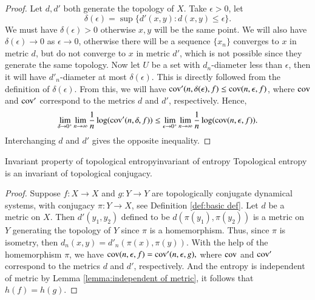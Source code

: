\documentclass[12pt,a4paper]{article}
\begin{document}
	\begin{proof}
		Let $d,d'$ both generate the topology of $X$. Take $\epsilon>0$, let
		$$
		\delta(\epsilon)=\sup \{d'(x,y):d(x,y)\leq \epsilon\}.
		$$
		We must have $\delta(\epsilon)>0$ otherwise $x,y$ will be the same point. We will also have $\delta(\epsilon)\to0 $ as $\epsilon\to 0$, otherwise there will be a sequence $\{x_n\}$ converges to $x$ in metric $d$, but do not converge to $x$ in metric $d'$, which is not possible since they generate the same topology. Now let $U$ be a set with $d_n$-diameter less than $\epsilon$, then it will have $d'_n$-diameter at most $\delta(\epsilon)$. This is directly followed from the definition of $\delta(\epsilon)$. From this, we will have $\text{cov}'(n,\delta(\epsilon),f)\leq \text{cov}(n,\epsilon,f)$, where $\text{cov}$ and $\text{cov}'$ correspond to the metrics $d$ and $d'$, respectively. Hence,
		$$
		\lim_{\delta\to 0^+}\lim_{n\to\infty} \frac{1}{n}\log(\text{cov}'(n,\delta,f))\leq \lim_{\epsilon\to 0^+}\lim_{n\to \infty} \frac{1}{n} \log(\text{cov}(n,\epsilon,f)).
		$$
		Interchanging $d$ and $d'$ gives the opposite inequality.
	\end{proof}
	
	\begin{corollary}{Invariant property of topological entropy}{invariant of entropy}
		Topological entropy is an invariant of topological conjugacy.
	\end{corollary}
	\begin{proof}
		Suppose $f:X\rightarrow X$ and $g:Y\to Y$ are topologically conjugate dynamical systems, with conjugacy $\pi: Y\rightarrow X$, see Definition \ref{def:basic def}. Let $d$ be a metric on $X$. Then $d'(y_1,y_2)$ defined to be $d(\pi(y_1),\pi(y_2))$ is a metric on $Y$ generating the topology of $Y$ since $\pi$ is a homemorphism. Thus, since $\pi$  is isometry, then $d_n(x,y) = d'_n(\pi(x),\pi(y))$. With the help of the homemorphism $\pi$,  we have
		$\text{cov}(n,\epsilon,f) = \text{cov}'(n,\epsilon,g),$
		where $\text{cov}$ and $\text{cov}'$ correspond to the metrics $d$ and $d'$, respectively. And the entropy is independent of metric by Lemma \ref{lemma:independent of metric}, it follows that $h(f)=h(g)$.
	\end{proof}
	
	
	
	\newcommand{\Z}{\mathbb{Z}}
	
\end{document}
